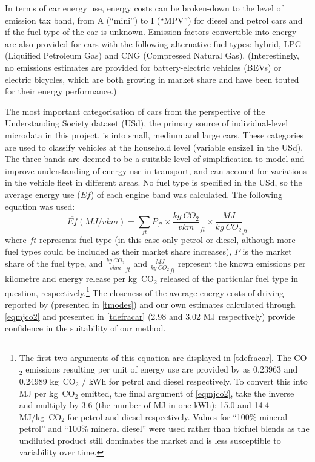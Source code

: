 In terms of car energy use,
energy costs can be broken-down to the level of
emission tax band, from A (``mini'') to I (``MPV'') for diesel and petrol
cars and if the fuel type of the car is unknown. Emission factors
convertible into energy are also provided for cars with the following
alternative fuel types: hybrid, LPG (Liquified Petroleum Gas)
and CNG (Compressed Natural Gas). (Interestingly, no emissions estimates
are provided for battery-electric vehicles (BEVs) or electric
bicycles, which are both growing in market share and have been touted for
their energy performance.) 

The most important categorisation of cars from the perspective of the Understanding
Society dataset (USd), the primary source of individual-level microdata in this project,
is into small, medium and large cars. These categories are used
to classify vehicles at the household level (variable ensize1 in the USd).
The three bands are deemed to be a suitable level of simplification to model and improve
understanding of energy use in transport, and can account for variations
in the vehicle fleet in different areas. No fuel type is specified in
the USd, so the average energy use ($Ef$) of each engine band was calculated.
The following equation was used:
\begin{equation}
\overline{Ef} (MJ/vkm) = \displaystyle{\sum_{ft}}
P_{ft} \times
\frac{kg~CO_{2}}{vkm}_{ft} \times \frac{MJ}{kg~CO_2}_{ft}
\label{eqmjco2}
\end{equation}
where $ft$ represents fuel type (in this case only petrol or diesel, although
more fuel types could be included as their market share increases), $P$ is the
market share of the fuel type, and $\frac{kg~CO_{2}}{vkm}_{ft}$ and $\frac{MJ}{kg~CO_2}_{ft}$
represent the known emissions per kilometre and energy release per kg~CO$_2$ released
of the particular fuel type in question,
respectively.\footnote{The
first two arguments of this equation are displayed
in \cref{tdefracar}. The CO$_2$ emissions resulting per unit of energy use
are provided by \citep[Table 1c]{Defra2011} as 0.23963 and 0.24989
kg~CO$_2$ / kWh for petrol and diesel respectively. To convert this into
MJ per kg~CO$_2$ emitted, the final argument of \cref{eqmjco2}, take the inverse
and multiply by 3.6 (the number of MJ in one kWh): 15.0 and 14.4 MJ/kg~CO$_2$
for petrol and diesel respectively. Values for ``100\% mineral petrol''
and ``100\% mineral diesel''
were used rather than biofuel blends as the undiluted product still dominates
the market and is less susceptible to variability over time.
}
The closeness of the average energy costs of driving reported by \citep{MacKay2009}
(presented in \cref{tmodes}) and our own estimates calculated through \cref{eqmjco2}
and presented in \cref{tdefracar} (2.98 and 3.02 MJ respectively) provide confidence
in the suitability of our method.
 

